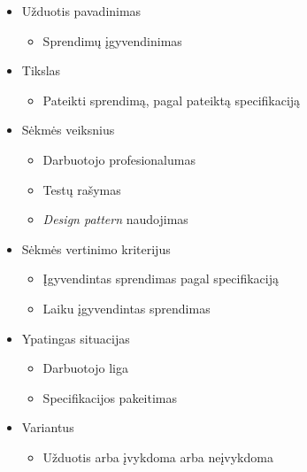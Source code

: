 \documentclass[10pt]{IEEEtran}
\begin{document}
            \begin{itemize}
                \item Užduotis pavadinimas
                \begin{itemize}
                    \item Sprendimų įgyvendinimas
                \end{itemize}
                \item Tikslas
                \begin{itemize}
                    \item Pateikti sprendimą, pagal pateiktą specifikaciją
                \end{itemize}
                \item Sėkmės veiksnius
                \begin{itemize}
                    \item Darbuotojo profesionalumas
                    \item Testų rašymas
                    \item \textit{Design pattern} naudojimas
                \end{itemize}
                \item Sėkmės vertinimo kriterijus
                \begin{itemize}
                    \item Įgyvendintas sprendimas pagal specifikaciją
                    \item Laiku įgyvendintas sprendimas
                \end{itemize}
                \item Ypatingas situacijas
                \begin{itemize}
                    \item Darbuotojo liga
                    \item Specifikacijos pakeitimas
                \end{itemize}
                \item Variantus
                \begin{itemize}
                    \item Užduotis arba įvykdoma arba neįvykdoma
                \end{itemize}
            \end{itemize}

            \enspace\enspace\enspace
\end{document}
